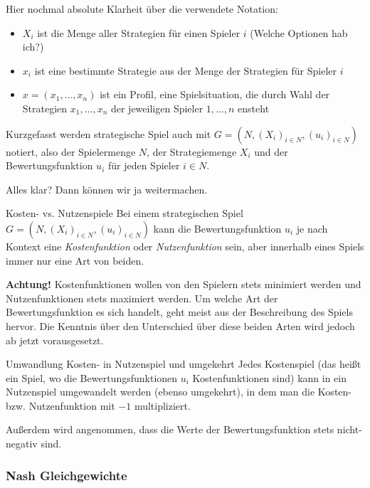 \documentclass{panikzettel}
\begin{document}
Hier nochmal absolute Klarheit über die verwendete Notation: 
\begin{itemize}
	\item $X_i$ ist die Menge aller Strategien für einen Spieler $i$ (Welche Optionen hab ich?)
	\item $x_i$ ist eine bestimmte Strategie aus der Menge der Strategien für Spieler $i$ 
	\item $x = (x_1, \dots , x_n)$ ist ein Profil, eine Spielsituation, die durch Wahl der Strategien $x_1, \dots, x_n$ der jeweiligen Spieler $1, \dots, n$ ensteht
\end{itemize}

Kurzgefasst werden strategische Spiel auch mit $G = (N, (X_i)_{i \in N}, (u_i)_{i \in N} )$ notiert, also der Spielermenge $N$, der Strategiemenge $X_i$ und der Bewertungsfunktion $u_i$ für jeden Spieler $i \in N$. 

Alles klar? Dann können wir ja weitermachen.

\begin{defi}{Kosten- vs. Nutzenspiele}
	Bei einem strategischen Spiel $G = (N, (X_i)_{i \in N}, (u_i)_{i \in N} )$ kann die Bewertungsfunktion $u_i$ je nach Kontext eine \emph{Kostenfunktion} oder \emph{Nutzenfunktion} sein, aber innerhalb eines Spiels immer nur eine Art von beiden.
	
	\textbf{\color{red} Achtung!} Kostenfunktionen wollen von den Spielern stets minimiert werden und Nutzenfunktionen stets maximiert werden. Um welche Art der Bewertungsfunktion es sich handelt, geht meist aus der Beschreibung des Spiels hervor. Die Kenntnis über den Unterschied über diese beiden Arten wird jedoch ab jetzt vorausgesetzt.
\end{defi}

\begin{theo}{Umwandlung Kosten- in Nutzenspiel und umgekehrt}
	Jedes Kostenspiel (das heißt ein Spiel, wo die Bewertungsfunktionen $u_i$ Kostenfunktionen sind) kann in ein Nutzenspiel umgewandelt werden (ebenso umgekehrt), in dem man die Kosten- bzw. Nutzenfunktion mit $-1$ multipliziert.
	
	Außerdem wird angenommen, dass die Werte der Bewertungsfunktion stets nicht-negativ sind.
\end{theo}

\subsubsection{Nash Gleichgewichte}
\end{document}
